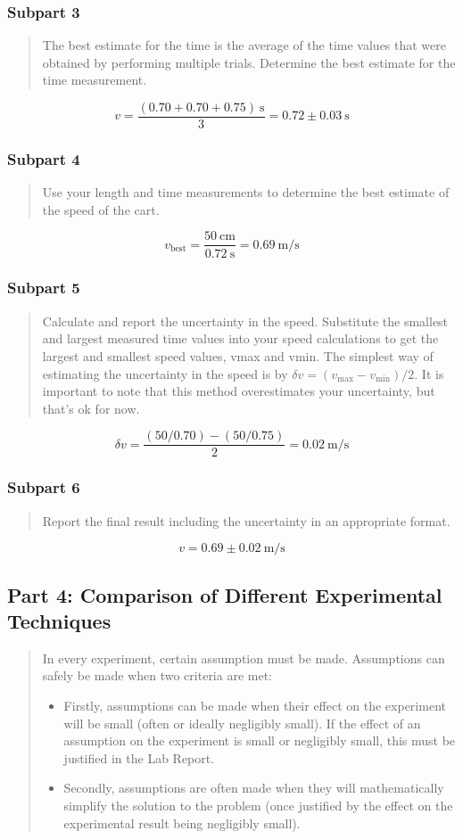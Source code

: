 \documentclass[8pt]{extarticle}
\newcommand{\plain}[1]{\textrm{#1}}
\begin{document}
{\subsubsection*{Subpart 3}
\begin{quote}
	The best estimate for the time is the average of the time values that were obtained by performing multiple trials. Determine the best estimate for the time measurement.
\end{quote}
\[ v = \frac{(0.70 + 0.70 + 0.75)~\plain{s}}{3} = 0.72\pm 0.03~\plain{s} \]
\subsubsection*{Subpart 4}
\begin{quote}
	Use your length and time measurements to determine the best estimate of the speed of the cart.
\end{quote}
\[ v_{\plain{best}} = \frac{50~\plain{cm}}{0.72~\plain{s}} = 0.69~\plain{m/s} \]
\subsubsection*{Subpart 5}
\begin{quote}
	Calculate and report the uncertainty in the speed. Substitute the smallest and largest measured time values into your speed calculations to get the largest and smallest speed values, vmax and vmin. The simplest way of estimating the uncertainty in the speed is by $ \delta v = (v_{\plain{max}} - v_{\plain{min}})/2 $. It is important to note that this method overestimates your uncertainty, but that’s ok for now.
\end{quote}
\[ \delta v = \frac{(50/0.70) - (50/0.75)}{2} = 0.02~\plain{m/s} \]
\subsubsection*{Subpart 6}
\begin{quote}
	Report the final result including the uncertainty in an appropriate format.
\end{quote}
\[ v = 0.69\pm 0.02~\plain{m/s} \]
\subsection*{Part 4: Comparison of Different Experimental Techniques}
\begin{quote}
	In every experiment, certain assumption must be made. Assumptions can safely be made when two criteria are met:
	\begin{itemize}
		\item Firstly, assumptions can be made when their effect on the experiment will be small (often or ideally negligibly small). If the effect of an assumption on the experiment is small or negligibly small, this must be justified in the Lab Report.
		\item Secondly, assumptions are often made when they will mathematically simplify the solution to the problem (once justified by the effect on the experimental result being negligibly small).
	\end{itemize}
\end{quote}
}
\end{document}
